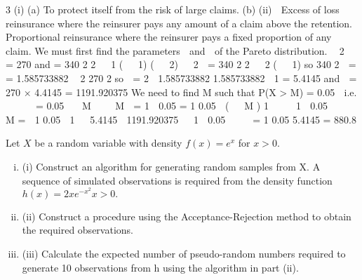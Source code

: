 \documentclass[a4paper,12pt]{article}
\begin{document}
\begin{enumerate}
3
(i)
(a)
To protect itself from the risk of large claims.
(b)
(ii)
 Excess of loss reinsurance where the reinsurer pays any amount of a claim above the retention.
 Proportional reinsurance where the reinsurer pays a fixed proportion of any claim.
We must first find the parameters  and  of the Pareto distribution.
 2

= 270 and
= 340 2
2
  1
(   1) (   2)

 2

= 340 2
2
  2 (   1)
so
340 2

=
= 1.585733882
 2
270 2
so  =
2  1.585733882
1.585733882  1
= 5.4145
and  = 270 × 4.4145 = 1191.920375
We need to find M such that P(X > M) = 0.05

i.e.
  

 = 0.05
  M 

 M

= 1

0.05
= 1
0.05  (   M )
1 

  1  0.05  



M = 
1
0.05 
1 

5.4145

1191.920375   1  0.05




=
1
0.05 5.4145
= 880.8
\newpage


Let $X$ be a random variable with density $f(x) = e^{x}$ for $x > 0$.



\begin{enumerate}[(i)]
\item 
(i) Construct an algorithm for generating random samples from X. 
A sequence of simulated observations is required from the density function
$h(x) = 2xe^{-x^2} x > 0.$
\item (ii) Construct a procedure using the Acceptance-Rejection method to obtain the required observations. 
\item (iii) Calculate the expected number of pseudo-random numbers required to generate 10 observations from h using the algorithm in part (ii). 
\end{enumerate}


\end{enumerate}
\end{document}
